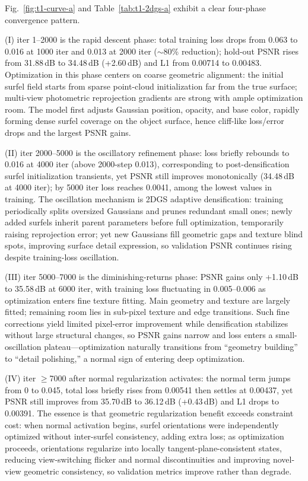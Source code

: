 \documentclass[10pt,twocolumn,letterpaper]{article}
\newcommand{\tabref}[1]{Table~\ref{#1}}
\begin{document}
Fig.~\ref{fig:t1-curve-a} and \tabref{tab:t1-2dgs-a} exhibit a clear four-phase convergence pattern.

(I) iter 1--2000 is the rapid descent phase: total training loss drops from 0.063 to 0.016 at 1000 iter and 0.013 at 2000 iter ($\sim$80\% reduction); hold-out PSNR rises from 31.88\,dB to 34.48\,dB (+2.60\,dB) and L1 from 0.00714 to 0.00483. Optimization in this phase centers on coarse geometric alignment: the initial surfel field starts from sparse point-cloud initialization far from the true surface; multi-view photometric reprojection gradients are strong with ample optimization room. The model first adjusts Gaussian position, opacity, and base color, rapidly forming dense surfel coverage on the object surface, hence cliff-like loss/error drops and the largest PSNR gains.

(II) iter 2000--5000 is the oscillatory refinement phase: loss briefly rebounds to 0.016 at 4000 iter (above 2000-step 0.013), corresponding to post-densification surfel initialization transients, yet PSNR still improves monotonically (34.48\,dB at 4000 iter); by 5000 iter loss reaches 0.0041, among the lowest values in training. The oscillation mechanism is 2DGS adaptive densification: training periodically splits oversized Gaussians and prunes redundant small ones; newly added surfels inherit parent parameters before full optimization, temporarily raising reprojection error; yet new Gaussians fill geometric gaps and texture blind spots, improving surface detail expression, so validation PSNR continues rising despite training-loss oscillation.

(III) iter 5000--7000 is the diminishing-returns phase: PSNR gains only +1.10\,dB to 35.58\,dB at 6000 iter, with training loss fluctuating in 0.005--0.006 as optimization enters fine texture fitting. Main geometry and texture are largely fitted; remaining room lies in sub-pixel texture and edge transitions. Such fine corrections yield limited pixel-error improvement while densification stabilizes without large structural changes, so PSNR gains narrow and loss enters a small-oscillation plateau---optimization naturally transitions from ``geometry building'' to ``detail polishing,'' a normal sign of entering deep optimization.

(IV) iter $\geq$7000 after normal regularization activates: the normal term jumps from 0 to 0.045, total loss briefly rises from 0.00541 then settles at 0.00437, yet PSNR still improves from 35.70\,dB to 36.12\,dB (+0.43\,dB) and L1 drops to 0.00391. The essence is that geometric regularization benefit exceeds constraint cost: when normal activation begins, surfel orientations were independently optimized without inter-surfel consistency, adding extra loss; as optimization proceeds, orientations regularize into locally tangent-plane-consistent states, reducing view-switching flicker and normal discontinuities and improving novel-view geometric consistency, so validation metrics improve rather than degrade.
\end{document}
